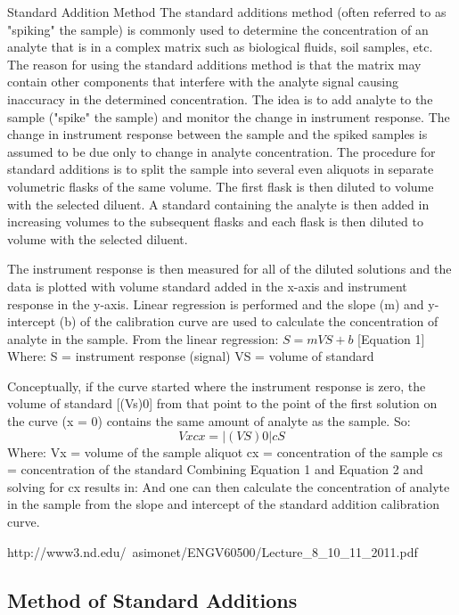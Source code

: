 Standard Addition Method
The standard additions method (often referred to as "spiking" the sample) is commonly used to determine the concentration of an analyte that
is in a complex matrix such as biological fluids, soil samples, etc. The reason for using the standard additions method is that the matrix may
contain other components that interfere with the analyte signal causing inaccuracy in the determined concentration. The idea is to add analyte
to the sample ("spike" the sample) and monitor the change in instrument response. The change in instrument response between the sample
and the spiked samples is assumed to be due only to change in analyte concentration.
The procedure for standard additions is to split the sample into several even aliquots in
separate volumetric flasks of the same volume. The first flask is then diluted to volume with
the selected diluent. A standard containing the analyte is then added in increasing volumes
to the subsequent flasks and each flask is then diluted to volume with the selected diluent.

The instrument response is then measured for all of the diluted solutions and the data is
plotted with volume standard added in the x-axis and instrument response in the y-axis.
Linear regression is performed and the slope (m) and y-intercept (b) of the calibration curve
are used to calculate the concentration of analyte in the sample.
From the linear regression: $S = mVS + b $ [Equation 1]
 Where: S = instrument response (signal)
 VS = volume of standard

Conceptually, if the curve started where the instrument response is zero, the volume of
standard [(Vs)0] from that point to the point of the first solution on the curve (x = 0) contains the same amount of analyte as the sample. So:
\[ Vxcx = |(VS)0|cS \] %
 Where: Vx = volume of the sample aliquot
 cx = concentration of the sample
 cs = concentration of the standard
Combining Equation 1 and Equation 2 and solving for cx results in:
And one can then calculate the concentration of analyte in the sample from the 
slope and intercept of the standard addition calibration curve.


http://www3.nd.edu/~asimonet/ENGV60500/Lecture_8_10_11_2011.pdf
\subsection{Method of Standard Additions}

